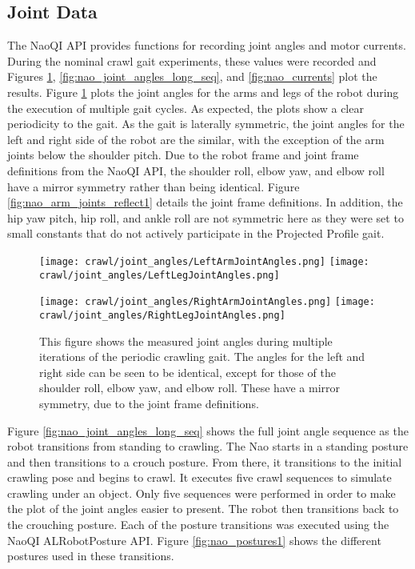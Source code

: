 \subsection{Joint Data} \label{subsec:nom_crawl_joint_data}
The NaoQI API provides functions for recording joint angles and motor currents. During the
nominal crawl gait experiments, these values were recorded and Figures \ref{fig:nao_joint_angles1},
\ref{fig:nao_joint_angles_long_seq}, and \ref{fig:nao_currents} plot the results.
Figure \ref{fig:nao_joint_angles1} plots the joint angles for the arms and legs of the
robot during the execution of multiple gait cycles. As expected, the plots show a clear
periodicity to the gait.
As the gait is laterally symmetric, the joint angles for the left and right side of the robot
are the similar, with the exception of the arm joints below the shoulder pitch.
Due to the robot frame and joint frame definitions from the NaoQI API, the shoulder roll,
elbow yaw, and elbow roll have a mirror symmetry rather than being identical.
Figure \ref{fig:nao_arm_joints_reflect1} details the joint frame definitions.
In addition, the hip yaw pitch, hip roll, and ankle roll are not symmetric here as they
were set to small constants that do not actively participate in the Projected Profile gait.

\begin{figure}
  \centerline{
    \texttt{[image: crawl/joint\_angles/LeftArmJointAngles.png]}
    \texttt{[image: crawl/joint\_angles/LeftLegJointAngles.png]}
  }
  \centerline{
    \texttt{[image: crawl/joint\_angles/RightArmJointAngles.png]}
    \texttt{[image: crawl/joint\_angles/RightLegJointAngles.png]}
  }
  \caption{This figure shows the measured joint angles during multiple iterations of the periodic crawling gait.
           The angles for the left and right side can be seen to be identical, except for those
           of the shoulder roll, elbow yaw, and elbow roll. These have a mirror symmetry, due to
           the joint frame definitions.}
  \label{fig:nao_joint_angles1}
\end{figure}

Figure \ref{fig:nao_joint_angles_long_seq} shows the full joint angle sequence as the robot
transitions from standing to crawling. The Nao starts in a standing posture and then transitions
to a crouch posture. From there, it transitions to the initial crawling pose and begins to
crawl. It executes five crawl sequences to simulate crawling under an object.
Only five sequences were performed in order to make the plot of the joint angles easier to present.
The robot then transitions back to the crouching posture. Each of the posture transitions was
executed using the NaoQI ALRobotPosture API.
Figure \ref{fig:nao_postures1} shows the different postures used in these transitions.

